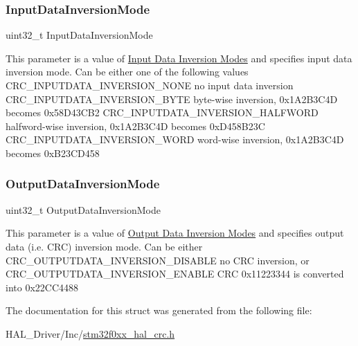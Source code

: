 \subsubsection{\texorpdfstring{Input\+Data\+Inversion\+Mode}{InputDataInversionMode}}
{\footnotesize\ttfamily uint32\+\_\+t Input\+Data\+Inversion\+Mode}

This parameter is a value of \hyperlink{group___c_r_c_ex___input___data___inversion}{Input Data Inversion Modes} and specifies input data inversion mode. Can be either one of the following values C\+R\+C\+\_\+\+I\+N\+P\+U\+T\+D\+A\+T\+A\+\_\+\+I\+N\+V\+E\+R\+S\+I\+O\+N\+\_\+\+N\+O\+NE no input data inversion C\+R\+C\+\_\+\+I\+N\+P\+U\+T\+D\+A\+T\+A\+\_\+\+I\+N\+V\+E\+R\+S\+I\+O\+N\+\_\+\+B\+Y\+TE byte-\/wise inversion, 0x1\+A2\+B3\+C4D becomes 0x58\+D43\+C\+B2 C\+R\+C\+\_\+\+I\+N\+P\+U\+T\+D\+A\+T\+A\+\_\+\+I\+N\+V\+E\+R\+S\+I\+O\+N\+\_\+\+H\+A\+L\+F\+W\+O\+RD halfword-\/wise inversion, 0x1\+A2\+B3\+C4D becomes 0x\+D458\+B23C C\+R\+C\+\_\+\+I\+N\+P\+U\+T\+D\+A\+T\+A\+\_\+\+I\+N\+V\+E\+R\+S\+I\+O\+N\+\_\+\+W\+O\+RD word-\/wise inversion, 0x1\+A2\+B3\+C4D becomes 0x\+B23\+C\+D458 \mbox{\label{struct_c_r_c___init_type_def_a70287496add23b9e3dbaaf370a83040a}} 
\subsubsection{\texorpdfstring{Output\+Data\+Inversion\+Mode}{OutputDataInversionMode}}
{\footnotesize\ttfamily uint32\+\_\+t Output\+Data\+Inversion\+Mode}

This parameter is a value of \hyperlink{group___c_r_c_ex___output___data___inversion}{Output Data Inversion Modes} and specifies output data (i.\+e. C\+RC) inversion mode. Can be either C\+R\+C\+\_\+\+O\+U\+T\+P\+U\+T\+D\+A\+T\+A\+\_\+\+I\+N\+V\+E\+R\+S\+I\+O\+N\+\_\+\+D\+I\+S\+A\+B\+LE no C\+RC inversion, or C\+R\+C\+\_\+\+O\+U\+T\+P\+U\+T\+D\+A\+T\+A\+\_\+\+I\+N\+V\+E\+R\+S\+I\+O\+N\+\_\+\+E\+N\+A\+B\+LE C\+RC 0x11223344 is converted into 0x22\+C\+C4488 

The documentation for this struct was generated from the following file\+:\begin{DoxyCompactItemize}
\item 
H\+A\+L\+\_\+\+Driver/\+Inc/\hyperlink{stm32f0xx__hal__crc_8h}{stm32f0xx\+\_\+hal\+\_\+crc.\+h}\end{DoxyCompactItemize}
